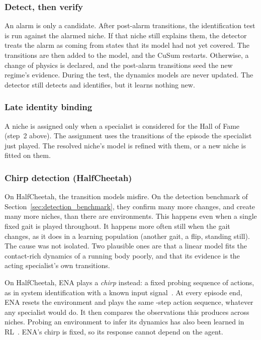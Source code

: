 \subsubsection{Detect, then verify}
An alarm is only a candidate. After  post-alarm transitions, the identification test is run against the alarmed niche. If that niche still explains them, the detector treats the alarm as coming from states that its model had not yet covered. The transitions are then added to the model, and the CuSum restarts. Otherwise, a change of physics is declared, and the post-alarm transitions seed the new regime's evidence. During the test, the dynamics models are never updated. The detector still detects and identifies, but it learns nothing new.

\subsubsection{Late identity binding}
A niche is assigned only when a specialist is considered for the Hall of Fame (step~2 above). The assignment uses the transitions of the episode the specialist just played. The resolved niche's model is refined with them, or a new niche is fitted on them.

\subsubsection{Chirp detection (HalfCheetah)}
\label{sec:chirp}
On HalfCheetah, the transition models misfire. On the detection benchmark of Section~\ref{sec:detection_benchmark}, they confirm many more changes, and create many more niches, than there are environments. This happens even when a single fixed gait is played throughout. It happens more often still when the gait changes, as it does in a learning population (another gait, a flip, standing still). The cause was not isolated. Two plausible ones are that a linear model fits the contact-rich dynamics of a running body poorly, and that its evidence is the acting specialist's own transitions.

On HalfCheetah, ENA plays a \textit{chirp} instead: a fixed probing sequence of actions, as in system identification with a known input signal~\cite{ljung1999system}. At every episode end, ENA resets the environment and plays the same -step action sequence, whatever any specialist would do. It then compares the observations this produces across niches. Probing an environment to infer its dynamics has also been learned in RL~\cite{zhou2019environment}. ENA's chirp is fixed, so its response cannot depend on the agent.

